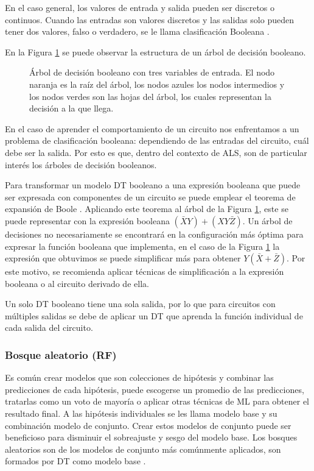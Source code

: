 En el caso general, los valores de entrada y salida pueden ser discretos o
continuos. Cuando las entradas son valores discretos y las salidas solo pueden
tener dos valores, falso o verdadero, se le llama clasificación Booleana
\cite{russell2016artificial}.

En la Figura \ref{fig:DT} se puede observar la estructura de un árbol de
decisión booleano.

\begin{figure}[htb]
  \centering
  
  \caption{Árbol de decisión booleano con tres variables de entrada. El nodo
    naranja es la raíz del árbol, los nodos azules los nodos intermedios y los
    nodos verdes son las hojas del árbol, los cuales representan la decisión a la
  que llega.}
  \label{fig:DT}
\end{figure}

En el caso de aprender el comportamiento de un circuito nos enfrentamos a un
problema de clasificación booleana: dependiendo de las entradas del circuito,
cuál debe ser la salida. Por esto es que, dentro del contexto de ALS, son de
particular interés los árboles de decisión booleanos.

Para transformar un modelo DT booleano a una expresión booleana que puede ser
expresada con componentes de un circuito se puede emplear el teorema de
expansión de Boole \cite{boole_investigation_1854}. Aplicando este teorema al
árbol de la Figura \ref{fig:DT}, este se puede representar con la expresión
booleana $(\bar{X}Y) + (XY\bar{Z})$. Un árbol de decisiones no necesariamente
se encontrará en la configuración más óptima para expresar la función booleana
que implementa, en el caso de la Figura \ref{fig:DT} la expresión que
obtuvimos se puede simplificar más para obtener $Y(\bar{X} + \bar{Z})$. Por
este motivo, se recomienda aplicar técnicas de simplificación a la expresión
booleana o al circuito derivado de ella.

Un solo DT booleano tiene una sola salida, por lo que para circuitos con
múltiples salidas se debe de aplicar un DT que aprenda la función individual de
cada salida del circuito.

\subsubsection{Bosque aleatorio (RF)}

Es común crear modelos que son colecciones de hipótesis y combinar las
predicciones de cada hipótesis, puede escogerse un promedio de las
predicciones, tratarlas como un voto de mayoría o aplicar otras técnicas de ML
para obtener el resultado final. A las hipótesis individuales se les llama
modelo base y su combinación modelo de conjunto.
Crear estos modelos de conjunto puede ser beneficioso para disminuir el
sobreajuste y sesgo del modelo base.
Los bosques aleatorios son de los modelos de conjunto más comúnmente aplicados,
son formados por DT como modelo base \cite{russell2016artificial}.

